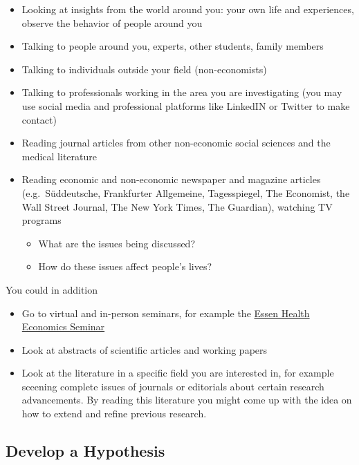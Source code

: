 \documentclass[
]{book}
\providecommand{\tightlist}{%
  \setlength{\itemsep}{0pt}\setlength{\parskip}{0pt}}
\begin{document}
\begin{itemize}
\tightlist
\item
  Looking at insights from the world around you: your own life and
  experiences, observe the behavior of people around you
\item
  Talking to people around you, experts, other students, family members
\item
  Talking to individuals outside your field (non-economists)
\item
  Talking to professionals working in the area you are investigating
  (you may use social media and professional platforms like LinkedIN or
  Twitter to make contact)
\item
  Reading journal articles from other non-economic social sciences and
  the medical literature
\item
  Reading economic and non-economic newspaper and magazine articles
  (e.g.~Süddeutsche, Frankfurter Allgemeine, Tagesspiegel, The
  Economist, the Wall Street Journal, The New York Times, The Guardian),
  watching TV programs

  \begin{itemize}
  \tightlist
  \item
    What are the issues being discussed?
  \item
    How do these issues affect people's lives?
  \end{itemize}
\end{itemize}

You could in addition

\begin{itemize}
\tightlist
\item
  Go to virtual and in-person seminars, for example the
  \href{https://www.goek.wiwi.uni-due.de/forschung/essen-health-economics-seminar/winter-2020-21/}{Essen
  Health Economics Seminar}
\item
  Look at abstracts of scientific articles and working papers
\item
  Look at the literature in a specific field you are interested in, for
  example sceening complete issues of journals or editorials about
  certain research advancements. By reading this literature you might
  come up with the idea on how to extend and refine previous research.
\end{itemize}

\hypertarget{develop-a-hypothesis}{%
\subsection{Develop a Hypothesis}\label{develop-a-hypothesis}}
\end{document}
